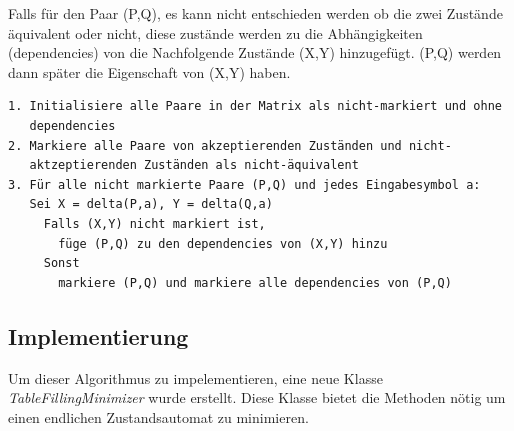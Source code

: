 Falls für den Paar (P,Q), es kann nicht entschieden werden ob die zwei Zustände
äquivalent oder nicht, diese zustände werden zu die Abhängigkeiten
(dependencies) von die Nachfolgende Zustände (X,Y) hinzugefügt. (P,Q) werden
dann später die Eigenschaft von (X,Y) haben.

\lstset{language=C, basicstyle=\footnotesize}
\begin{lstlisting}[float=h!, frame=tb, captionpos=b,
caption={Table-Filling-Algorithmus : Pseudocode}, label=list:TextGrammar, inputencoding=latin1]
1. Initialisiere alle Paare in der Matrix als nicht-markiert und ohne
   dependencies
2. Markiere alle Paare von akzeptierenden Zuständen und nicht-
   aktzeptierenden Zuständen als nicht-äquivalent
3. Für alle nicht markierte Paare (P,Q) und jedes Eingabesymbol a:
   Sei X = delta(P,a), Y = delta(Q,a)
     Falls (X,Y) nicht markiert ist,
       füge (P,Q) zu den dependencies von (X,Y) hinzu
     Sonst
       markiere (P,Q) und markiere alle dependencies von (P,Q)
\end{lstlisting}

\subsection{Implementierung}

Um dieser Algorithmus zu impelementieren, eine neue Klasse
\textit{TableFillingMinimizer} wurde erstellt. Diese Klasse bietet die Methoden
nötig um einen endlichen Zustandsautomat zu minimieren.

